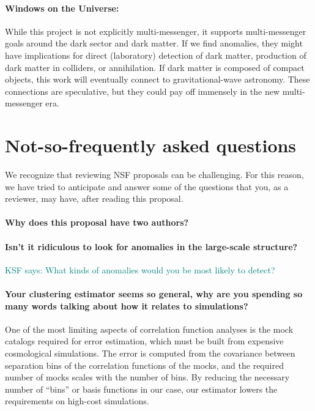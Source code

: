 \documentclass[12pt, fullpage, letterpaper]{article}
\newcommand{\KSF}[1]{\textcolor{teal}{KSF says: #1}}
\begin{document}
\paragraph{Windows on the Universe:}
While this project is not explicitly multi-messenger, it supports
multi-messenger goals around the dark sector and dark matter. If we
find anomalies, they might have implications for direct (laboratory)
detection of dark matter, production of dark matter in colliders, or
annihilation. If dark matter is composed of compact objects, this work
will eventually connect to gravitational-wave astronomy. These
connections are speculative, but they could pay off immensely in the
new multi-messenger era.

\section{Not-so-frequently asked questions}

We recognize that reviewing NSF proposals can be challenging.
For this reason, we have tried to anticipate and answer some of the
questions that you, as a reviewer, may have, after reading this
proposal.

\paragraph{Why does this proposal have two authors?}

\paragraph{Isn't it ridiculous to look for anomalies in the large-scale structure?} \KSF{What kinds of anomalies would you be most likely to detect?}

\paragraph{Your clustering estimator seems so general, why are you spending so many words talking about how it relates to simulations?}

One of the most limiting aspects of correlation function analyses is the mock catalogs required for error estimation, which must be built from expensive cosmological simulations. The error is computed from the covariance between separation bins of the correlation functions of the mocks, and the required number of mocks scales with the number of bins. By reducing the necessary number of ``bins'' or basis functions in our case, our estimator lowers the requirements on high-cost simulations.
\end{document}
